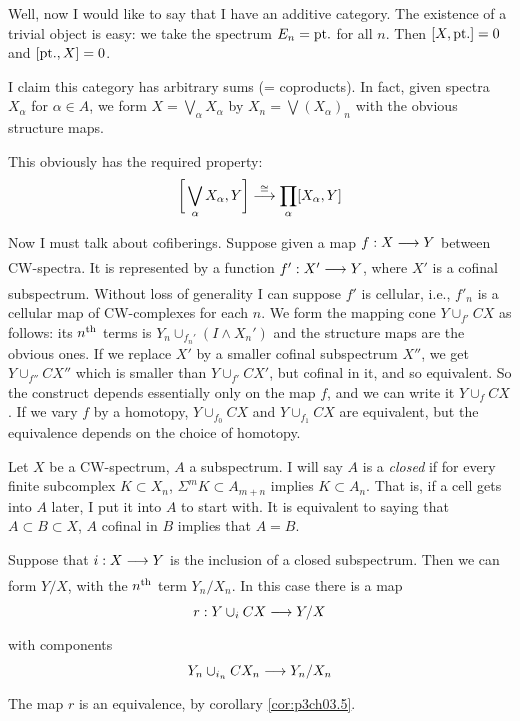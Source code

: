 \documentclass[../main]{subfiles}
\begin{document}
Well, now I would like to say that I have an additive category. The
existence of a trivial object is easy: we take the spectrum $E_n=\mathrm{pt.}$ for all $n$. Then $[X,\mathrm{pt.}]=0$ and $[\mathrm{pt.},X]=0 $.

I claim this category has arbitrary sums (= coproducts). In fact,
given spectra $X_\alpha$ for $\alpha\in A$, we form $X=\bigvee_\alpha X_\alpha$ by $X_n=\bigvee (X_\alpha)_n$ with the obvious structure maps.


This obviously has the required property:
\[\bigg[\bigvee_\alpha X_\alpha,Y\bigg] \lar{\cong} \prod_\alpha [X_\alpha,Y] \]

Now I must talk about cofiberings. Suppose given a map $f:X\lar{}Y$ between CW-spectra. It is represented by a function $f':X'\lar{}Y$, where $X'$ is a cofinal subspectrum. Without loss of generality I can suppose $f'$ is cellular, i.e., $f'_n$ is a cellular map of CW-complexes for each $n$. We form the mapping cone $Y\cup_{f'} CX$ as follows: its $n^{\text{th}}$ terms is $Y_n \cup_{f_n'} (I\wedge X_n')$ and the structure maps are the obvious ones. If we replace $X'$ by a smaller cofinal subspectrum $X''$, we get $Y\cup_{f''} CX''$ which is smaller than $Y\cup_{f'} CX'$, but cofinal in it, and so equivalent. So the construct depends essentially only on the map $f$, and we can write it $Y\cup_f CX$. If we vary $f$ by a homotopy, $Y\cup_{f_0} CX$ and $Y\cup_{f_1} CX$ are equivalent, but the equivalence depends on the choice of homotopy.

Let $X$ be a CW-spectrum, $A$ a subspectrum. I will say $A$ is a \emph{closed}  if for every finite subcomplex $K\subset X_n$, $\Sigma^mK\subset A_{m+n}$ implies $K\subset A_n$. That is, if a cell gets into $A$ later, I put it into $A$ to start with. It is equivalent to saying that $A\subset B\subset X$, $A$ cofinal in $B$ implies that $A=B$.

Suppose that $i:X\lar{}Y$ is the inclusion of a closed subspectrum. Then we can form $Y/X$, with the $n^{\text{th}}$ term $Y_n/X_n$. In this case there is a map \[r:Y\cup_i CX\lar{} Y/X \]
with components \[Y_n\cup_{i_n} CX_n \lar{} Y_n/X_n \]
The map $r$ is an equivalence, by corollary \ref{cor:p3ch03.5}.
\end{document}
